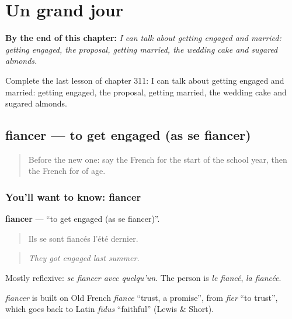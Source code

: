
\chapter{Un grand jour}
\label{ch:fr-un-grand-jour}

\begin{chapteropening}
\textbf{By the end of this chapter:} \emph{I can talk about getting engaged and married: getting engaged, the proposal, getting married, the wedding cake and sugared almonds.}

Complete the last lesson of chapter 311: I can talk about getting engaged and married: getting engaged, the proposal, getting married, the wedding cake and sugared almonds.
\end{chapteropening}

\section[fiancer]{fiancer — to get engaged (as se fiancer)}

\label{lesson:FR-C311-fiancer}



\begin{quote}
Before the new one: say the French for the start of the school year, then the French for of age.
\end{quote}

\subsection*{You'll want to know: fiancer}
\textbf{fiancer} — \textquotedblleft{}to get engaged (as se fiancer)\textquotedblright{}.

\begin{quote}
Ils se sont fiancés l'été dernier.
\end{quote}

\begin{quote}
\emph{They got engaged last summer.}
\end{quote}

Mostly reflexive: \emph{se fiancer avec quelqu'un}. The person is \emph{le fiancé}, \emph{la fiancée}.

\begin{cousinweb}
\emph{fiancer} is built on Old French \emph{fiance} \textquotedblleft{}trust, a promise\textquotedblright{}, from \emph{fier} \textquotedblleft{}to trust\textquotedblright{}, which goes back to Latin \emph{fīdus} \textquotedblleft{}faithful\textquotedblright{} (Lewis \& Short).
\end{cousinweb}

